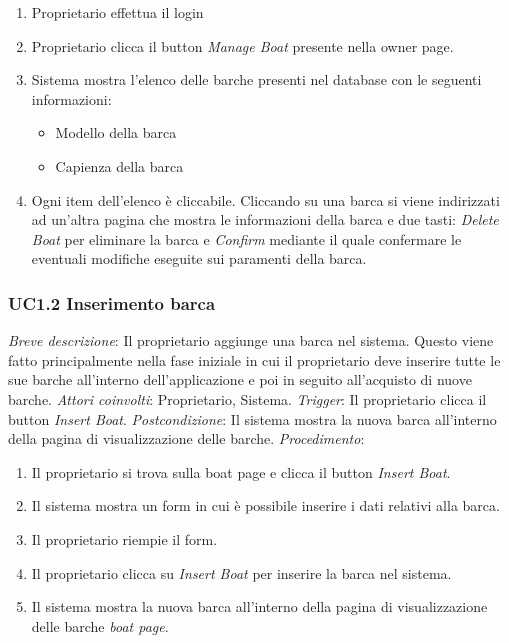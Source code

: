 \begin{enumerate}
    \item Proprietario effettua il login
    \item Proprietario clicca il button \textit{Manage Boat} presente nella owner page.
    \item Sistema mostra l'elenco delle barche presenti nel database con le seguenti informazioni:
          \begin{itemize}
              \item Modello della barca
              \item Capienza della barca
          \end{itemize}
    \item Ogni item dell'elenco è cliccabile. Cliccando su una barca si viene indirizzati ad un'altra pagina che mostra le informazioni della barca e due tasti: \textit{Delete Boat} per eliminare la barca e \textit{Confirm} mediante il quale confermare le eventuali modifiche eseguite sui paramenti della barca. 
\end{enumerate}

\subsubsection{UC1.2 Inserimento barca}

 \emph{Breve descrizione}: Il proprietario aggiunge una barca nel sistema. Questo viene fatto principalmente nella fase iniziale in cui il proprietario deve inserire
tutte le sue barche all'interno dell'applicazione e poi in seguito all'acquisto di nuove barche.\medbreak
 \emph{Attori coinvolti}: Proprietario, Sistema.\medbreak
 \emph{Trigger}: Il proprietario clicca il button \textit{Insert Boat}.\medbreak
 \emph{Postcondizione}: Il sistema mostra la nuova barca all'interno della pagina di visualizzazione delle barche.\medbreak
 \emph{Procedimento}:

\begin{enumerate}
    \item Il proprietario si trova sulla boat page e clicca il button \textit{Insert Boat}.
    \item Il sistema mostra un form in cui è possibile inserire i dati relativi alla barca.
    \item Il proprietario riempie il form.
    \item Il proprietario clicca su \textit{Insert Boat} per inserire la barca nel sistema.
    \item Il sistema mostra la nuova barca all'interno della pagina di visualizzazione delle barche \textit{boat page}.
\end{enumerate}

